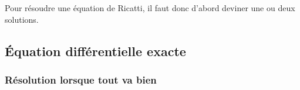 Pour résoudre une équation de Ricatti, il faut donc d'abord deviner une ou deux solutions.

\subsection{Équation différentielle exacte}
\label{SubSecEqDiffExacte}

\subsubsection{Résolution lorsque tout va bien}

